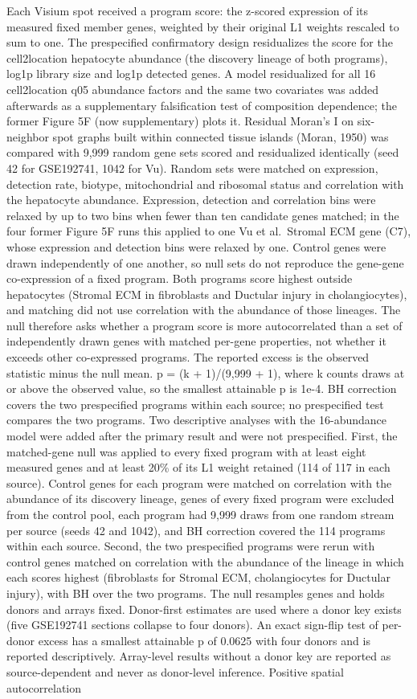 Each Visium spot received a program score: the z-scored expression of its measured fixed member genes, weighted by their original L1 weights rescaled to sum to one. The prespecified confirmatory design residualizes the score for the cell2location hepatocyte abundance (the discovery lineage of both programs), log1p library size and log1p detected genes. A model residualized for all 16 cell2location q05 abundance factors and the same two covariates was added afterwards as a supplementary falsification test of composition dependence; the former Figure 5F (now supplementary) plots it. Residual Moran's I on six-neighbor spot graphs built within connected tissue islands (Moran, 1950) was compared with 9,999 random gene sets scored and residualized identically (seed 42 for GSE192741, 1042 for Vu). Random sets were matched on expression, detection rate, biotype, mitochondrial and ribosomal status and correlation with the hepatocyte abundance. Expression, detection and correlation bins were relaxed by up to two bins when fewer than ten candidate genes matched; in the four former Figure 5F runs this applied to one Vu et al.~Stromal ECM gene (C7), whose expression and detection bins were relaxed by one. Control genes were drawn independently of one another, so null sets do not reproduce the gene-gene co-expression of a fixed program. Both programs score highest outside hepatocytes (Stromal ECM in fibroblasts and Ductular injury in cholangiocytes), and matching did not use correlation with the abundance of those lineages. The null therefore asks whether a program score is more autocorrelated than a set of independently drawn genes with matched per-gene properties, not whether it exceeds other co-expressed programs. The reported excess is the observed statistic minus the null mean. p = (k + 1)/(9,999 + 1), where k counts draws at or above the observed value, so the smallest attainable p is 1e-4. BH correction covers the two prespecified programs within each source; no prespecified test compares the two programs. Two descriptive analyses with the 16-abundance model were added after the primary result and were not prespecified. First, the matched-gene null was applied to every fixed program with at least eight measured genes and at least 20\% of its L1 weight retained (114 of 117 in each source). Control genes for each program were matched on correlation with the abundance of its discovery lineage, genes of every fixed program were excluded from the control pool, each program had 9,999 draws from one random stream per source (seeds 42 and 1042), and BH correction covered the 114 programs within each source. Second, the two prespecified programs were rerun with control genes matched on correlation with the abundance of the lineage in which each scores highest (fibroblasts for Stromal ECM, cholangiocytes for Ductular injury), with BH over the two programs. The null resamples genes and holds donors and arrays fixed. Donor-first estimates are used where a donor key exists (five GSE192741 sections collapse to four donors). An exact sign-flip test of per-donor excess has a smallest attainable p of 0.0625 with four donors and is reported descriptively. Array-level results without a donor key are reported as source-dependent and never as donor-level inference. Positive spatial autocorrelation 